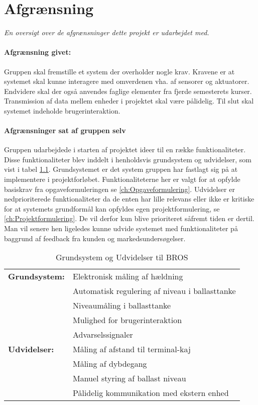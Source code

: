 \chapter{Afgrænsning}
\label{ch:afgraensning}
\textit{En oversigt over de afgrænsninger dette projekt er udarbejdet med.}
\subsubsection{Afgrænsning givet:}
Gruppen skal fremstille et system der overholder nogle krav. Kravene er at systemet skal kunne interagere med omverdenen vha. af sensorer og aktuatorer. Endvidere skal der også anvendes faglige elementer fra fjerde semesterets kurser. Transmission af data mellem enheder i projektet skal være pålidelig. Til slut skal systemet indeholde brugerinteraktion. 
\subsubsection{Afgrænsninger sat af gruppen selv}
Gruppen udarbejdede i starten af projektet ideer til en række funktionaliteter. Disse funktionaliteter blev inddelt i henholdsvis grundsystem og udvidelser, som vist i tabel \ref{tabel:Grundogudvid}.
Grundsystemet er det system gruppen har fastlagt sig på at implementere i projektforløbet. Funktionaliteterne her er valgt for at opfylde basiskrav fra opgaveformuleringen se \ref{ch:Opgaveformulering}.
Udvidelser er nedprioriterede funktionaliteter da de enten har lille relevans eller ikke er kritiske for at systemets grundformål kan opfyldes egen projektformulering, se \ref{ch:Projektformulering}. De vil derfor kun blive prioriteret såfremt tiden er dertil. 
Man vil senere hen ligeledes kunne udvide systemet med funktionaliteter på baggrund af feedback fra kunden og markedsundersøgelser.

\begin{table}[H]
\centering
\begin{tabular}{|l|l|}
\hline
\textbf{Grundsystem:} &Elektronisk måling af hældning\\
 &Automatisk regulering af niveau i ballasttanke\\
 &Niveaumåling i ballasttanke\\
 &Mulighed for brugerinteraktion\\
 &Advarselssignaler\\\hline
\textbf{Udvidelser:} &Måling af afstand til terminal-kaj\\
 &Måling af dybdegang\\
 &Manuel styring af ballast niveau\\
 &Pålidelig kommunikation med ekstern enhed\\\hline
\end{tabular}
\caption{Grundsystem og Udvidelser til BROS}
\label{tabel:Grundogudvid}
\end{table}
